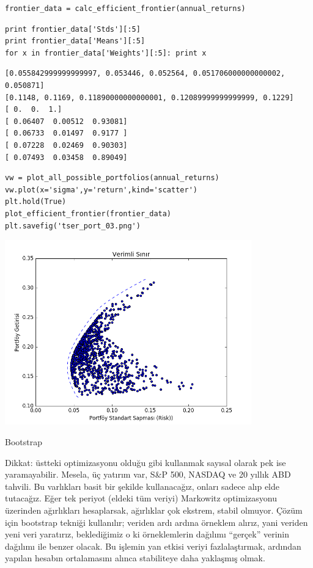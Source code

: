 \documentclass[12pt,fleqn]{article}\usepackage{../../common}
\begin{document}
\begin{verbatim}
frontier_data = calc_efficient_frontier(annual_returns)
\end{verbatim}

\begin{verbatim}
print frontier_data['Stds'][:5]
print frontier_data['Means'][:5]
for x in frontier_data['Weights'][:5]: print x
\end{verbatim}

\begin{verbatim}
[0.055842999999999997, 0.053446, 0.052564, 0.051706000000000002, 0.050871]
[0.1148, 0.1169, 0.11890000000000001, 0.12089999999999999, 0.1229]
[ 0.  0.  1.]
[ 0.06407  0.00512  0.93081]
[ 0.06733  0.01497  0.9177 ]
[ 0.07228  0.02469  0.90303]
[ 0.07493  0.03458  0.89049]
\end{verbatim}


\begin{verbatim}
vw = plot_all_possible_portfolios(annual_returns)
vw.plot(x='sigma',y='return',kind='scatter')
plt.hold(True)
plot_efficient_frontier(frontier_data)
plt.savefig('tser_port_03.png')
\end{verbatim}

\includegraphics[height=8cm]{tser_port_03.png}

Bootstrap

Dikkat: üstteki optimizasyonu olduğu gibi kullanmak sayısal olarak pek ise
yaramayabilir.  Mesela, üç yatırım var, S\&P 500, NASDAQ ve 20 yıllık ABD
tahvili. Bu varlıkları basit bir şekilde kullanacağız, onları sadece alıp elde
tutacağız. Eğer tek periyot (eldeki tüm veriyi) Markowitz optimizasyonu
üzerinden ağırlıkları hesaplarsak, ağırlıklar çok ekstrem, stabil olmuyor. Çözüm
için bootstrap tekniği kullanılır; veriden ardı ardına örneklem alırız, yani
veriden yeni veri yaratırız, beklediğimiz o ki örneklemlerin dağılımı ``gerçek''
verinin dağılımı ile benzer olacak. Bu işlemin yan etkisi veriyi fazlalaştırmak,
ardından yapılan hesabın ortalamasını alınca stabiliteye daha yaklaşmış olmak.
\end{document}
